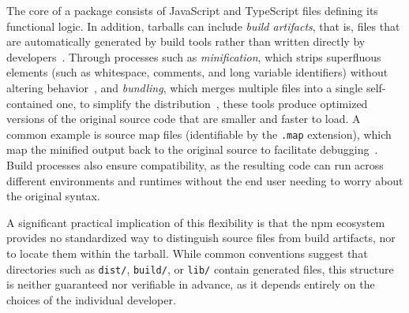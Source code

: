 The core of a package consists of JavaScript and TypeScript files defining its functional logic.
In addition, tarballs can include \emph{build artifacts}, that is, files that are
automatically generated by build tools rather than written directly by developers~\cite{9240695}.
Through processes such as \emph{minification}, 
which strips superfluous elements (such as whitespace, comments, and long variable identifiers) without altering behavior~\cite{minification},
and \emph{bundling}, which merges multiple files into a single self-contained one, to simplify the distribution~\cite{bundling},
these tools produce optimized versions of the original source code that are smaller and faster to load.
A common example is source map files (identifiable by the \texttt{.map} extension),
which map the minified output back to the original source to facilitate debugging~\cite{sourceMap}.
Build processes also ensure compatibility, as the resulting code can run across 
different environments and runtimes without the end user needing to worry about the original syntax.

A significant practical implication of this flexibility is that the \ac{npm} ecosystem provides no standardized
way to distinguish source files from build artifacts, nor to locate them within the tarball.
While common conventions suggest that directories such as \texttt{dist/}, \texttt{build/}, or \texttt{lib/}
contain generated files, this structure is neither guaranteed nor verifiable in advance,
as it depends entirely on the choices of the individual developer.